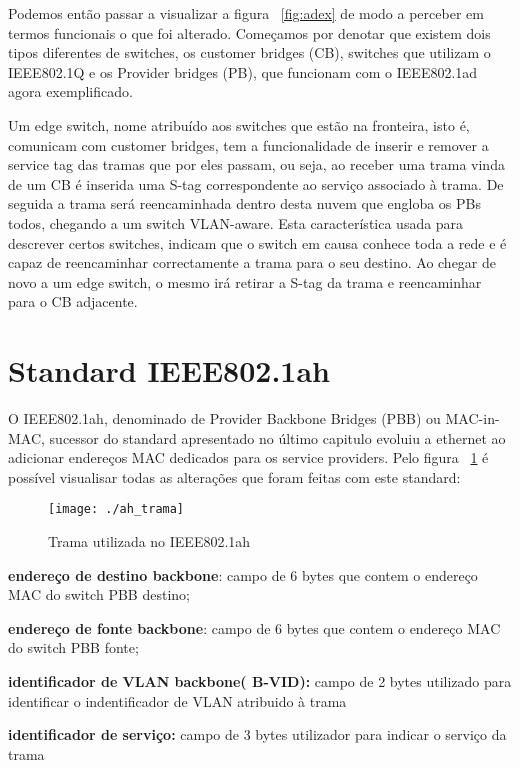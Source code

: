 \documentclass[a4paper]{IEEEtran}
\begin{document}
Podemos então passar a visualizar a figura ~\ref{fig:adex} de modo a perceber em termos funcionais o que foi alterado. Começamos por denotar que existem dois tipos diferentes de switches, os customer bridges (CB), switches que utilizam o IEEE802.1Q e os Provider bridges (PB), que funcionam com o IEEE802.1ad agora exemplificado. 

Um edge switch, nome atribuído aos switches que estão na fronteira, isto é, comunicam com customer bridges, tem a funcionalidade de inserir e remover a service tag das tramas que por eles passam, ou seja, ao receber uma trama vinda de um CB é inserida uma S-tag correspondente ao serviço associado à trama. De seguida a trama será reencaminhada dentro desta nuvem que engloba os PBs todos, chegando a um switch VLAN-aware. Esta característica usada para descrever certos switches, indicam que o switch em causa conhece toda a rede e é capaz de reencaminhar correctamente a trama para o seu destino. Ao chegar de novo a um edge switch, o mesmo irá retirar a S-tag da trama e reencaminhar para o CB adjacente.


\section{Standard IEEE802.1ah}
\label{sec:802.1ah}

O IEEE802.1ah, denominado de Provider Backbone Bridges (PBB) ou MAC-in-MAC, sucessor do standard apresentado no último capitulo evoluiu a ethernet ao adicionar endereços MAC dedicados para os service providers.  Pelo figura ~\ref{fig:trama_ah} é possível visualisar todas as alterações que foram feitas com este standard:

\begin{figure}[htp]
	\centering
	\texttt{[image: ./ah\_trama]}
	\caption{Trama utilizada no IEEE802.1ah}
	\label{fig:trama_ah}
\end{figure}

\textbf{endereço de destino backbone}: campo de 6 bytes que contem o endereço MAC do switch PBB destino;

\textbf{endereço de fonte backbone}: campo de 6 bytes que contem o endereço MAC do switch PBB fonte;

\textbf{identificador de VLAN backbone( B-VID):} campo de 2 bytes utilizado para identificar o indentificador de VLAN atribuido à trama

\textbf{identificador de serviço:} campo de 3 bytes utilizador para indicar o serviço da trama
\end{document}
